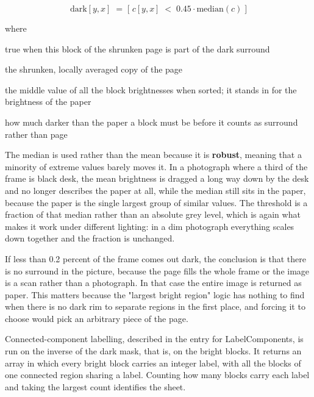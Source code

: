 \begin{equation}
\mathrm{dark}[y,x] \;=\; \big[\; c[y,x] \;<\; 0.45 \cdot \mathrm{median}(c) \;\big]
\end{equation}

\noindent where
\begin{description}[leftmargin=2.4em,style=nextline,font=\normalfont\ttfamily]\setlength\itemsep{1pt}
  \item[{$\mathrm{dark}[y,x]$}] \normalfont true when this block of the shrunken page is part of the dark surround
  \item[{$c$}] \normalfont the shrunken, locally averaged copy of the page
  \item[{$\mathrm{median}(c)$}] \normalfont the middle value of all the block brightnesses when sorted; it stands in for the brightness of the paper
  \item[{$0.45$}] \normalfont how much darker than the paper a block must be before it counts as surround rather than page
\end{description}
The median is used rather than the mean because it is \textbf{robust}, meaning that a minority of extreme values barely moves it. In a photograph where a third of the frame is black desk, the mean brightness is dragged a long way down by the desk and no longer describes the paper at all, while the median still sits in the paper, because the paper is the single largest group of similar values. The threshold is a fraction of that median rather than an absolute grey level, which is again what makes it work under different lighting: in a dim photograph everything scales down together and the fraction is unchanged.


If less than 0.2 percent of the frame comes out dark, the conclusion is that there is no surround in the picture, because the page fills the whole frame or the image is a scan rather than a photograph. In that case the entire image is returned as paper. This matters because the "largest bright region" logic has nothing to find when there is no dark rim to separate regions in the first place, and forcing it to choose would pick an arbitrary piece of the page.


Connected-component labelling, described in the entry for LabelComponents, is run on the inverse of the dark mask, that is, on the bright blocks. It returns an array in which every bright block carries an integer label, with all the blocks of one connected region sharing a label. Counting how many blocks carry each label and taking the largest count identifies the sheet.


